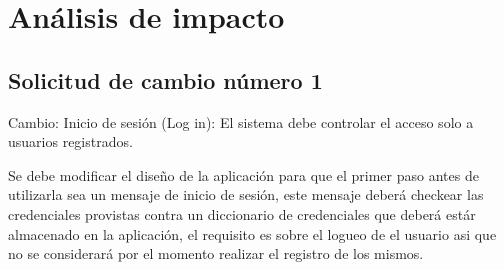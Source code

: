 \chapter{Análisis de impacto}

\section{Solicitud de cambio número 1}
Cambio: Inicio de sesión (Log in): El sistema debe controlar el acceso solo a usuarios
registrados.

Se debe modificar el diseño de la aplicación para que el primer paso antes de utilizarla sea un mensaje de inicio de sesión, este mensaje deberá checkear las credenciales provistas contra un diccionario de credenciales que deberá estár almacenado en la aplicación, el requisito es sobre el logueo de el usuario asi que no se considerará por el momento realizar el registro de los mismos.


